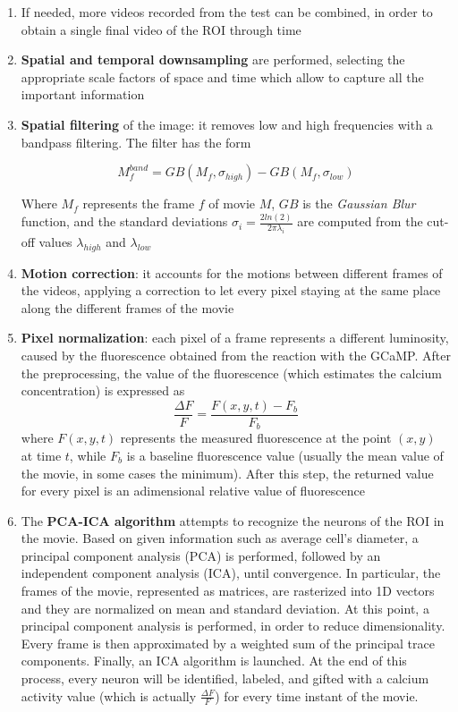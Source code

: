 \documentclass[a4paper]{article}
\begin{document}
\begin{enumerate}
	
	\item If needed, more videos recorded from the test can be combined, in order to obtain a single final video of the ROI through time
	
	\item \textbf{Spatial and temporal downsampling} are performed, selecting the appropriate scale factors of space and time which allow to capture all the important information
	
	\item \textbf{Spatial filtering} of the image: it removes low and high frequencies with a bandpass filtering. The filter has the form
	
	$$ M_f^{band} = GB(M_f,\sigma_{high}) - GB(M_f,\sigma_{low})$$
	
	Where $M_f$  represents the frame $f$ of movie $M$, $GB$ is the \textit{Gaussian Blur} function, and the standard deviations $ \sigma_i = \frac{2 ln(2)}{2 \pi \lambda_i}$ are computed from the cut-off values $ \lambda_{high}$ and $ \lambda_{low}$
	
	\item \textbf{Motion correction}: it accounts for the motions between different frames of the videos, applying a correction to let every pixel staying at the same place along the different frames of the movie
	
	\item \textbf{Pixel normalization}: each pixel of a frame represents a different luminosity, caused by the fluorescence obtained from the reaction with the GCaMP. After the preprocessing, the value of the fluorescence (which estimates the calcium concentration) is expressed as 
	$$\frac{\Delta F }{F} = \frac{F(x,y,t) - F_b}{F_b}$$
	where $F(x,y,t)$ represents the measured fluorescence at the point $(x,y)$ at time $t$, while $F_b$ is a baseline fluorescence value (usually the mean value of the movie, in some cases the minimum). After this step, the returned value for every pixel is an adimensional relative value of fluorescence
	
	\item The \textbf{PCA-ICA algorithm} attempts to recognize the neurons of the ROI in the movie. Based on given information such as average cell's diameter, a principal component analysis (PCA) is performed, followed by an independent component analysis (ICA), until convergence. In particular, the frames of the movie, represented as matrices, are rasterized into 1D vectors and they are normalized on mean and standard deviation. At this point, a principal component analysis is performed, in order to reduce dimensionality. Every frame is then approximated by a weighted sum of the principal trace components. Finally, an ICA algorithm is launched. At the end of this process, every neuron will be identified, labeled, and gifted with a calcium activity value (which is actually  $\frac{\Delta F }{F}$) for every time instant of the movie. 
	

\end{enumerate}
\end{document}
